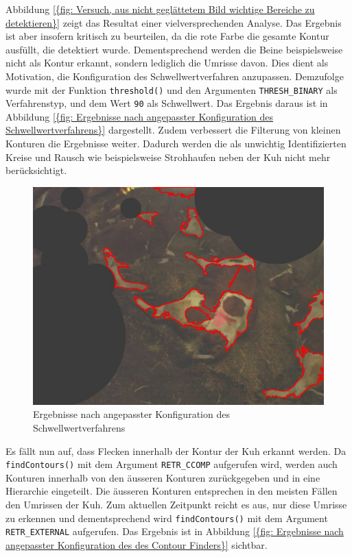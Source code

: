 Abbildung \ref{{fig: Versuch, aus nicht geglättetem Bild wichtige Bereiche zu detektieren}} zeigt das Resultat einer vielversprechenden Analyse. Das Ergebnis ist aber insofern kritisch zu beurteilen, da die rote Farbe die gesamte Kontur ausfüllt, die detektiert wurde. Dementsprechend werden die Beine beispielsweise nicht als Kontur erkannt, sondern lediglich die Umrisse davon.
Dies dient als Motivation, die Konfiguration des Schwellwertverfahren anzupassen. Demzufolge wurde mit der Funktion \texttt{threshold()} und den Argumenten \texttt{THRESH_BINARY} als Verfahrenstyp, und dem Wert \texttt{90} als Schwellwert. Das Ergebnis daraus ist in Abbildung \ref{{fig: Ergebnisse nach angepasster Konfiguration des Schwellwertverfahrens}} dargestellt. Zudem verbessert die Filterung von kleinen Konturen die Ergebnisse weiter. Dadurch werden die als unwichtig Identifizierten Kreise und Rausch wie beispielsweise Strohhaufen neben der Kuh nicht mehr berücksichtigt.
\begin{figure}[H]
	\center
	\includegraphics[scale=0.43]{Grafiken/entwicklung/12SimpleThresholdingConoturOutlineCCOMP.jpg}
	\caption{Ergebnisse nach angepasster Konfiguration des Schwellwertverfahrens} 
	\label{fig: Ergebnisse nach angepasster Konfiguration des Schwellwertverfahrens} 
\end{figure}
Es fällt nun auf, dass Flecken innerhalb der Kontur der Kuh erkannt werden. Da \texttt{findContours()} mit dem Argument \texttt{RETR_CCOMP} aufgerufen wird, werden auch Konturen innerhalb von den äusseren Konturen zurückgegeben und in eine  Hierarchie eingeteilt. Die äusseren Konturen entsprechen in den meisten Fällen den Umrissen der Kuh. Zum aktuellen Zeitpunkt reicht es aus, nur diese Umrisse zu erkennen und dementsprechend wird \texttt{findContours()} mit dem Argument \texttt{RETR_EXTERNAL} aufgerufen. Das Ergebnis ist in Abbildung  \ref{{fig: Ergebnisse nach angepasster Konfiguration des des Contour Finders}} sichtbar.
